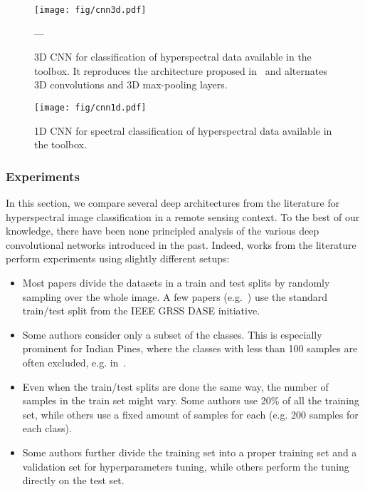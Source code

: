\documentclass[journal]{IEEEtran}
\begin{document}
\begin{figure*}[!tbp]
\begin{center}
\texttt{[image: fig/cnn3d.pdf]}
\caption{3D CNN for classification of hyperspectral data available in the toolbox. It reproduces the architecture proposed in~\cite{chen_deep_2016} and alternates 3D convolutions and 3D max-pooling layers.}
\label{fig:chen3d}---
\end{center}
\end{figure*}


\begin{figure}[!tbp]
\begin{center}
\texttt{[image: fig/cnn1d.pdf]}
\caption{1D CNN for spectral classification of hyperspectral data available in the toolbox.}
\label{fig:dnn1d}
\end{center}
\end{figure}

\subsubsection{Experiments}

In this section, we compare several deep architectures from the literature for hyperspectral image classification in a remote sensing context. To the best of our knowledge, there have been none principled analysis of the various deep convolutional networks introduced in the past. Indeed, works from the literature perform experiments using slightly different setups:
\begin{itemize}
	\item Most papers divide the datasets in a train and test splits by randomly sampling over the whole image. A few papers (e.g.~\cite{mou_deep_2017,kemker_low-shot_2018}) use the standard train/test split from the IEEE GRSS DASE initiative.
    \item Some authors consider only a subset of the classes. This is especially prominent for Indian Pines, where the classes with less than 100 samples are often excluded, e.g. in~\cite{hu_deep_2015,lee_kwon-contextualCNN4HSI_TIP2017}.
    \item Even when the train/test splits are done the same way, the number of samples in the train set might vary. Some authors use 20\% of all the training set, while others use a fixed amount of samples for each (e.g. 200 samples for each class).
    \item Some authors further divide the training set into a proper training set and a validation set for hyperparameters tuning, while others perform the tuning directly on the test set.
\end{itemize}
\end{document}

